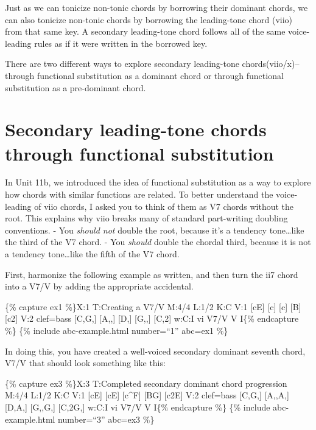 \documentclass{book}
\begin{document}
Just as we can tonicize non-tonic chords by borrowing their dominant chords,
we can also tonicize non-tonic chords by borrowing the leading-tone chord
(viio) from that same key. A secondary leading-tone chord follows all of the
same voice-leading rules as if it were written in the borrowed key.

There are two different ways to explore secondary leading-tone
chords(viio/x)--through functional substitution as a dominant chord or through
functional substitution as a pre-dominant chord.

\hypertarget{secondary-leading-tone-chords-through-functional-substitution}{%
\section{Secondary leading-tone chords through functional
substitution}\label{secondary-leading-tone-chords-through-functional-substitution}}

In Unit 11b, we introduced the idea of functional substitution as a way to
explore how chords with similar functions are related. To better understand
the voice-leading of viio chords, I asked you to think of them as V7 chords
without the root. This explains why viio breaks many of standard part-writing
doubling conventions. - You \emph{should not} double the root, because it's a
tendency tone\ldots like the third of the V7 chord. - You \emph{should} double
the chordal third, because it is not a tendency tone\ldots like the fifth of
the V7 chord.

First, harmonize the following example as written, and then turn the ii7 chord
into a V7/V by adding the appropriate accidental.

\{\% capture ex1 \%\}X:1 T:Creating a V7/V M:4/4 L:1/2 K:C V:1 {[}cE{]}
{[}c{]}\textbar{} {[}c{]} {[}B{]}\textbar{} {[}c2{]}\textbar{]} V:2 clef=bass
{[}C,G,{]} {[}A,,{]}\textbar{} {[}D,{]} {[}G,,{]}\textbar{}
{[}C,2{]}\textbar{]} w:C:I vi V7/V V I\{\% endcapture \%\} \{\% include
abc-example.html number=``1'' abc=ex1 \%\}

In doing this, you have created a well-voiced secondary dominant seventh
chord, V7/V that should look something like this:

\{\% capture ex3 \%\}X:3 T:Completed secondary dominant chord progression
M:4/4 L:1/2 K:C V:1 {[}cE{]} {[}cE{]}\textbar{} {[}c\^{}F{]}
{[}BG{]}\textbar{} {[}c2E{]}\textbar{]} V:2 clef=bass {[}C,G,{]}
{[}A,,A,{]}\textbar{} {[}D,A,{]} {[}G,,G,{]}\textbar{} {[}C,2G,{]}\textbar{]}
w:C:I vi V7/V V I\{\% endcapture \%\} \{\% include abc-example.html
number=``3'' abc=ex3 \%\}
\end{document}
